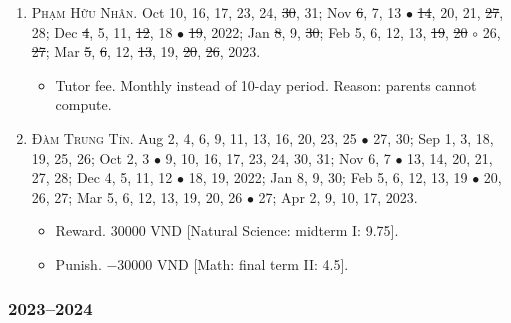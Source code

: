 \documentclass{article}
\begin{document}
\begin{enumerate}
\begin{itemize}
	\end{itemize}
	\item \textsc{Phạm Hữu Nhân.} {\sf[In]} Oct 10, 16, 17, 23, 24, \st{30}, 31; Nov \st{6}, 7, 13 $\bullet$ \st{14}, 20, 21, \st{27}, 28; Dec \st{4}, 5, 11, \st{12}, 18 $\bullet$ \st{19}, 2022; Jan \st{8}, 9, \st{30}; Feb 5, 6, 12, 13, \st{19}, \st{20} $\circ$ 26, \st{27}; Mar \st{5}, \st{6}, 12, \st{13}, 19, \st{20}, \st{26}, 2023. {}
	\begin{itemize}
		\item {\sf Tutor fee.} Monthly instead of 10-day period. Reason: parents cannot compute.
	\end{itemize}
	\item \textsc{Đàm Trung Tín.} {\sf[In]} Aug 2, 4, 6, 9, 11, 13, 16, 20, 23, 25 $\bullet$ 27, 30; Sep 1, 3, 18, 19, 25, 26; Oct 2, 3 $\bullet$ 9, 10, 16, 17, 23, 24, 30, 31; Nov 6, 7 $\bullet$ 13, 14, 20, 21, 27, 28; Dec 4, 5, 11, 12 $\bullet$ 18, 19, 2022; Jan 8, 9, 30; Feb 5, 6, 12, 13, 19 $\bullet$ 20, 26, 27; Mar 5, 6, 12, 13, 19, 20, 26 $\bullet$ 27; Apr 2, 9, 10, 17, 2023. {\sf[Out]}
	\begin{itemize}
		\item {\sf Reward.} 30000 VND [Natural Science: midterm I: 9.75].
		\item {\sf Punish.} $-30000$ VND [Math: final term II: 4.5].
	\end{itemize}
\end{enumerate}

\subsubsection{2023--2024}
 
\end{document}
